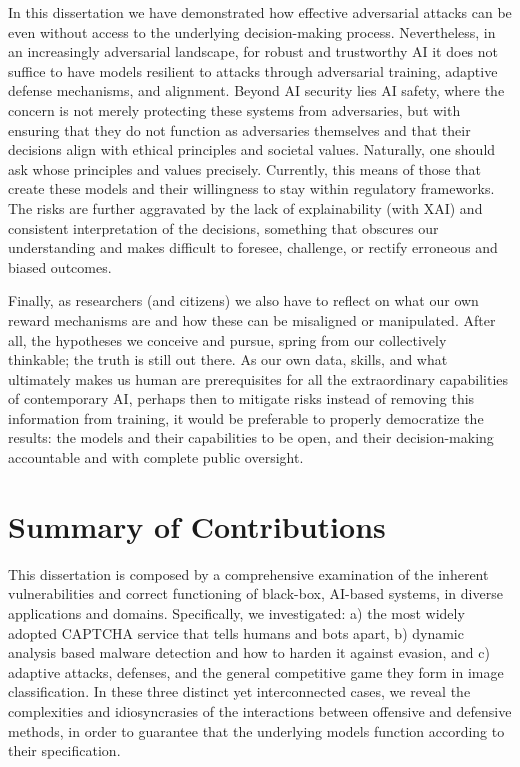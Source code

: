 In this dissertation we have demonstrated how effective adversarial attacks can be even without access to the underlying decision-making process.
Nevertheless, in an increasingly adversarial landscape, for robust and trustworthy \gls{AI} it does not suffice to have models resilient to attacks through adversarial training, adaptive defense mechanisms, and alignment.
Beyond AI security lies AI safety, where the concern is not merely protecting these systems from adversaries, but with ensuring that they do not function as adversaries themselves and that their decisions align with ethical principles and societal values.
Naturally, one should ask whose principles and values precisely.
Currently, this means of those that create these models and their willingness to stay within regulatory frameworks.
The risks are further aggravated by the lack of explainability (with \gls{XAI}) and consistent interpretation of the decisions, something that obscures our understanding and makes difficult to foresee, challenge, or rectify erroneous and biased outcomes.

Finally, as researchers (and citizens) we also have to reflect on what our own reward mechanisms are and how these can be misaligned or manipulated.
After all, the hypotheses we conceive and pursue, spring from our collectively thinkable; the truth is still out there.
As our own data, skills, and what ultimately makes us human are prerequisites for all the extraordinary capabilities of contemporary \gls{AI}, perhaps then to mitigate risks instead of removing this information from training, it would be preferable to properly democratize the results: the models and their capabilities to be open, and their decision-making accountable and with complete public oversight.

\section{Summary of Contributions}
This dissertation is composed by a comprehensive examination of the inherent vulnerabilities and correct functioning of black-box, AI-based systems, in diverse applications and domains.
Specifically, we investigated: a) the most widely adopted CAPTCHA service that tells humans and bots apart, b) dynamic analysis based malware detection and how to harden it against evasion, and c) adaptive attacks, defenses, and the general competitive game they form in image classification.
In these three distinct yet interconnected cases, we reveal the complexities and idiosyncrasies of the interactions between offensive and defensive methods, in order to guarantee that the underlying models function according to their specification.

